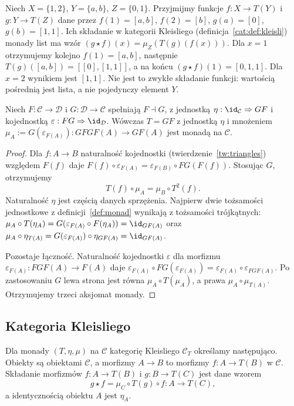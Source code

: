 \begin{przyklad}
Niech $X=\{1,2\}$, $Y=\{a,b\}$, $Z=\{0,1\}$. Przyjmijmy funkcje $f:X\to T(Y)$ i $g:Y\to T(Z)$ dane przez
$f(1)=[a,b]$, $f(2)=[b]$, $g(a)=[0]$, $g(b)=[1,1]$.
Ich składanie w kategorii Kleisliego (definicja~\ref{cat:def:kleisli}) monady list ma wzór $(g\star f)(x)=\mu_Z(T(g)(f(x)))$. Dla $x=1$ otrzymujemy kolejno $f(1)=[a,b]$, następnie $T(g)([a,b])=[[0],[1,1]]$, a na końcu $(g\star f)(1)=[0,1,1]$. Dla $x=2$ wynikiem jest $[1,1]$. Nie jest to zwykłe składanie funkcji: wartością pośrednią jest lista, a nie pojedynczy element $Y$.
\end{przyklad}


\begin{twierdzenie}\label{cat:thm:adjunction-monad}
Niech $F:\mathcal C\to\mathcal D$ i $G:\mathcal D\to\mathcal C$ spełniają $F\dashv G$, z jednostką $\eta:\id_{\mathcal C}\Rightarrow GF$ i kojednostką $\varepsilon:FG\Rightarrow\id_{\mathcal D}$. Wówczas $T=GF$ z jednostką $\eta$ i mnożeniem $\mu_A:=G(\varepsilon_{F(A)}):GFGF(A)\to GF(A)$ jest monadą na $\mathcal C$.
\end{twierdzenie}
\begin{proof}
Dla $f:A\to B$ naturalność kojednostki (twierdzenie~\ref{tw:triangles}) względem $F(f)$ daje $F(f)\circ\varepsilon_{F(A)}=\varepsilon_{F(B)}\circ FG(F(f))$. Stosując $G$, otrzymujemy
\[
T(f)\circ\mu_A=\mu_B\circ T^2(f).
\]
Naturalność $\eta$ jest częścią danych sprzężenia. Najpierw dwie tożsamości jednostkowe z definicji~\ref{def:monad} wynikają z tożsamości trójkątnych:
$\mu_A\circ T(\eta_A)=G(\varepsilon_{F(A)}\circ F(\eta_A))=\id_{GF(A)}$ oraz
$\mu_A\circ\eta_{T(A)}=G(\varepsilon_{F(A)})\circ\eta_{GF(A)}=\id_{GF(A)}$.

Pozostaje łączność. Naturalność kojednostki $\varepsilon$ dla morfizmu $\varepsilon_{F(A)}:FGF(A)\to F(A)$ daje
$\varepsilon_{F(A)}\circ FG(\varepsilon_{F(A)})=\varepsilon_{F(A)}\circ\varepsilon_{FGF(A)}$. Po zastosowaniu $G$ lewa strona jest równa $\mu_A\circ T(\mu_A)$, a prawa $\mu_A\circ\mu_{T(A)}$. Otrzymujemy trzeci aksjomat monady.
\end{proof}

\subsection{Kategoria Kleisliego}

\begin{definicja}\label{cat:def:kleisli}
Dla monady $(T,\eta,\mu)$ na $\mathcal C$ kategorię Kleisliego $\mathcal C_T$ określamy następująco. Obiekty są obiektami $\mathcal C$, a morfizmy $A\to B$ to morfizmy $f:A\to T(B)$ w $\mathcal C$. Składanie morfizmów $f:A\to T(B)$ i $g:B\to T(C)$ jest dane wzorem
\[
g\star f=\mu_C\circ T(g)\circ f:A\to T(C),
\]
a identycznością obiektu $A$ jest $\eta_A$.
\end{definicja}


